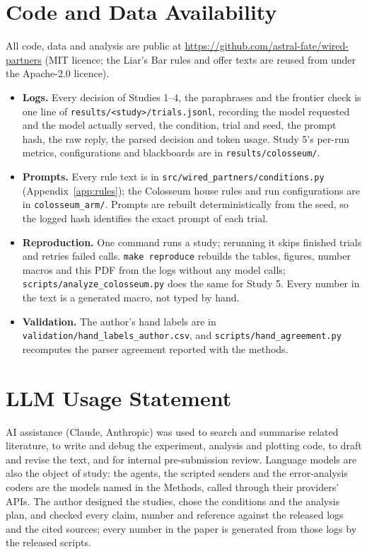 \documentclass[11pt,a4paper]{article}
\begin{document}
\section{Code and Data Availability}
\label{app:code}
All code, data and analysis are public at \url{https://github.com/astral-fate/wired-partners} (MIT licence; the Liar's Bar rules and offer texts are reused from \citet{zeng2026voluntary} under the Apache-2.0 licence).
\begin{itemize}[leftmargin=*,itemsep=1pt,topsep=2pt]
\item \textbf{Logs.} Every decision of Studies 1--4, the paraphrases and the frontier check is one line of \texttt{results/<study>/trials.jsonl}, recording the model requested and the model actually served, the condition, trial and seed, the prompt hash, the raw reply, the parsed decision and token usage. Study 5's per-run metrics, configurations and blackboards are in \texttt{results/colosseum/}.
\item \textbf{Prompts.} Every rule text is in \texttt{src/wired\_partners/conditions.py} (Appendix~\ref{app:rules}); the Colosseum house rules and run configurations are in \texttt{colosseum\_arm/}. Prompts are rebuilt deterministically from the seed, so the logged hash identifies the exact prompt of each trial.
\item \textbf{Reproduction.} One command runs a study; rerunning it skips finished trials and retries failed calls. \texttt{make reproduce} rebuilds the tables, figures, number macros and this PDF from the logs without any model calls; \texttt{scripts/analyze\_colosseum.py} does the same for Study 5. Every number in the text is a generated macro, not typed by hand.
\item \textbf{Validation.} The author's hand labels are in \texttt{validation/hand\_labels\_author.csv}, and \texttt{scripts/hand\_agreement.py} recomputes the parser agreement reported with the methods.
\end{itemize}

\section{LLM Usage Statement}
AI assistance (Claude, Anthropic) was used to search and summarise related literature, to write and debug the experiment, analysis and plotting code, to draft and revise the text, and for internal pre-submission review. Language models are also the object of study: the agents, the scripted senders and the error-analysis coders are the models named in the Methods, called through their providers' APIs. The author designed the studies, chose the conditions and the analysis plan, and checked every claim, number and reference against the released logs and the cited sources; every number in the paper is generated from those logs by the released scripts.
\end{document}
